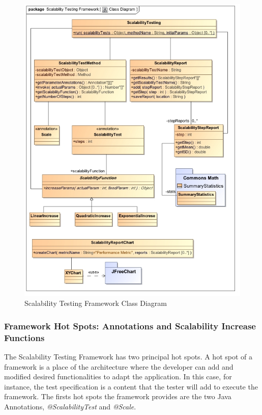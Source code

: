 \begin{figure}[htbp]
\begin{center}
	\includegraphics[scale=0.75]{images/classDiagram.jpg}
\caption{Scalability Testing Framework Class Diagram}
\label{classDiagram}
\end{center}
\end{figure}

\subsubsection{Framework Hot Spots: Annotations and Scalability Increase Functions}
The Scalability Testing Framework has two principal hot spots. A hot spot of a framework is a place of the architecture where the developer can add and modified desired functionalities to adapt the application. In this case, for instance, the test specification is a content that the tester will add to execute the framework. The firsts hot spots the framework provides are the two Java Annotations, \emph{@ScalabilityTest} and \emph{@Scale}.

